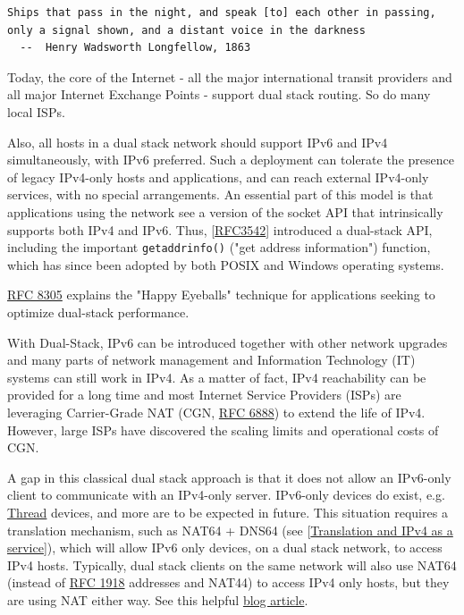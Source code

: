 \documentclass[
]{article}
\begin{document}
\begin{verbatim}
Ships that pass in the night, and speak [to] each other in passing,
only a signal shown, and a distant voice in the darkness
  --  Henry Wadsworth Longfellow, 1863
\end{verbatim}

Today, the core of the Internet - all the major international transit
providers and all major Internet Exchange Points - support dual stack
routing. So do many local ISPs.

Also, all hosts in a dual stack network should support IPv6 and IPv4
simultaneously, with IPv6 preferred. Such a deployment can tolerate the
presence of legacy IPv4-only hosts and applications, and can reach
external IPv4-only services, with no special arrangements. An essential
part of this model is that applications using the network see a version
of the socket API that intrinsically supports both IPv4 and IPv6. Thus,
{[}\href{https://www.rfc-editor.org/info/rfc3542}{RFC3542}{]} introduced
a dual-stack API, including the important \texttt{getaddrinfo()} ("get
address information") function, which has since been adopted by both
POSIX and Windows operating systems.

\href{https://www.rfc-editor.org/info/rfc8305}{RFC 8305} explains the
"Happy Eyeballs" technique for applications seeking to optimize
dual-stack performance.

With Dual-Stack, IPv6 can be introduced together with other network
upgrades and many parts of network management and Information Technology
(IT) systems can still work in IPv4. As a matter of fact, IPv4
reachability can be provided for a long time and most Internet Service
Providers (ISPs) are leveraging Carrier-Grade NAT (CGN,
\href{https://www.rfc-editor.org/info/rfc6888}{RFC 6888}) to extend the
life of IPv4. However, large ISPs have discovered the scaling limits and
operational costs of CGN.

A gap in this classical dual stack approach is that it does not allow an
IPv6-only client to communicate with an IPv4-only server. IPv6-only
devices do exist, e.g.
\href{https://www.threadgroup.org/What-is-Thread/Overview}{Thread}
devices, and more are to be expected in future. This situation requires
a translation mechanism, such as NAT64 + DNS64 (see
{[}\hyperref[translation-and-ipv4-as-a-service]{Translation and IPv4 as
a service}{]}), which will allow IPv6 only devices, on a dual stack
network, to access IPv4 hosts. Typically, dual stack clients on the same
network will also use NAT64 (instead of
\href{https://www.rfc-editor.org/info/rfc1918}{RFC 1918} addresses and
NAT44) to access IPv4 only hosts, but they are using NAT either way. See
this helpful
\href{https://sgryphon.gamertheory.net/2022/12/14/running-nat64-in-a-dual-stack-network/}{blog
article}.
\end{document}
